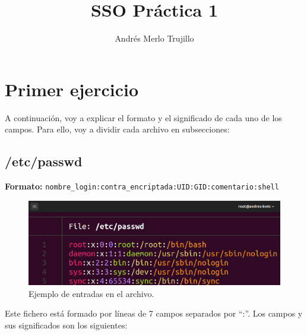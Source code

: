 \documentclass{article}
\title{SSO Práctica 1}
\author{Andrés Merlo Trujillo}
\date{}
\begin{document}
\maketitle

\tableofcontents

\section{Primer ejercicio}
A continuación, voy a explicar el formato y el significado de cada uno de los campos. Para ello, voy a dividir cada archivo en subsecciones:

\subsection{/etc/passwd}
\textbf{Formato:} \verb|nombre_login:contra_encriptada:UID:GID:comentario:shell|

\begin{figure}[H]
    \includegraphics[width=\textwidth]{imagenes/passwdfile.png}
    \caption{Ejemplo de entradas en el archivo.}
\end{figure}

\bigskip

Este fichero está formado por líneas de 7 campos separados por ``:''. Los campos y sus significados son los siguientes:
\end{document}
